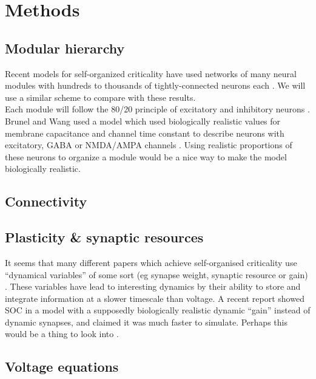 \documentclass[a4paper, 12pt]{article}
\begin{document}
\section*{Methods}

\subsection*{Modular hierarchy}
Recent models for self-organized criticality have used networks of many neural modules with hundreds to thousands of tightly-connected neurons each \cite{munozlg, rubinov}. We will use a similar scheme to compare with these results.\\

Each module will follow the 80/20 principle of excitatory and inhibitory neurons \cite{larremorerestrepo}. Brunel and Wang used a model which used biologically realistic values for membrane capacitance and channel time constant to describe neurons with excitatory, GABA or NMDA/AMPA channels \cite{objectworkingmemory}. Using realistic proportions of these neurons to organize a module would be a nice way to make the model biologically realistic.

\subsection*{Connectivity}
\subsection*{Plasticity \& synaptic resources}
It seems that many different papers which achieve self-organised criticality use ``dynamical variables'' of some sort (eg synapse weight, synaptic resource or gain) \cite{munozlg, rubinov, kinouchi}. These variables have lead to interesting dynamics by their ability to store and integrate information at a slower timescale than voltage. A recent report showed SOC in a model with a supposedly biologically realistic dynamic ``gain'' instead of dynamic synapses, and claimed it was much faster to simulate. Perhaps this would be a thing to look into \cite{kinouchi}.

\subsection*{Voltage equations}
\end{document}

